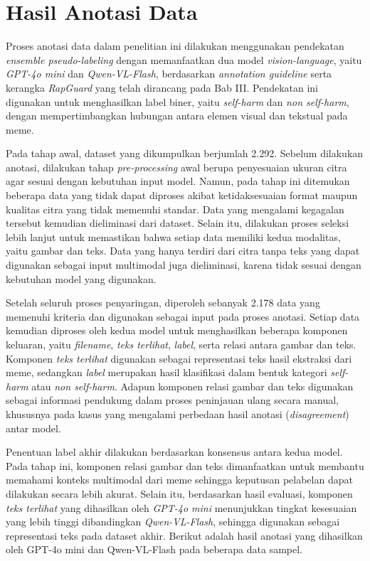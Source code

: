 \section{Hasil Anotasi Data} \label{IV.Anotasi}

Proses anotasi data dalam penelitian ini dilakukan menggunakan pendekatan \textit{ensemble pseudo-labeling} dengan memanfaatkan dua model \textit{vision-language}, yaitu \textit{GPT-4o mini} dan \textit{Qwen-VL-Flash}, berdasarkan \textit{annotation guideline} serta kerangka \textit{RapGuard} yang telah dirancang pada Bab III. Pendekatan ini digunakan untuk menghasilkan label biner, yaitu \textit{self-harm} dan \textit{non self-harm}, dengan mempertimbangkan hubungan antara elemen visual dan tekstual pada meme.

Pada tahap awal, dataset yang dikumpulkan berjumlah 2.292. Sebelum dilakukan anotasi, dilakukan tahap \textit{pre-processing} awal berupa penyesuaian ukuran citra  agar sesuai dengan kebutuhan input model. Namun, pada tahap ini ditemukan beberapa data yang tidak dapat diproses akibat ketidaksesuaian format maupun kualitas citra yang tidak memenuhi standar. Data yang mengalami kegagalan tersebut kemudian dieliminasi dari dataset. Selain itu, dilakukan proses seleksi lebih lanjut untuk memastikan bahwa setiap data memiliki kedua modalitas, yaitu gambar dan teks. Data yang hanya terdiri dari citra tanpa teks yang dapat digunakan sebagai input multimodal juga dieliminasi, karena tidak sesuai dengan kebutuhan model yang digunakan.

Setelah seluruh proses penyaringan, diperoleh sebanyak 2.178 data yang memenuhi kriteria dan digunakan sebagai input pada proses anotasi. Setiap data kemudian diproses oleh kedua model untuk menghasilkan beberapa komponen keluaran, yaitu \textit{filename}, \textit{teks terlihat}, \textit{label}, serta relasi antara gambar dan teks. Komponen \textit{teks terlihat} digunakan sebagai representasi teks hasil ekstraksi dari meme, sedangkan \textit{label} merupakan hasil klasifikasi dalam bentuk kategori \textit{self-harm} atau \textit{non self-harm}. Adapun komponen relasi gambar dan teks digunakan sebagai informasi pendukung dalam proses peninjauan ulang secara manual, khususnya pada kasus yang mengalami perbedaan hasil anotasi (\textit{disagreement}) antar model.

Penentuan label akhir dilakukan berdasarkan konsensus antara kedua model. Pada tahap ini, komponen relasi gambar dan teks dimanfaatkan untuk membantu memahami konteks multimodal dari meme sehingga keputusan pelabelan dapat dilakukan secara lebih akurat. Selain itu, berdasarkan hasil evaluasi, komponen \textit{teks terlihat} yang dihasilkan oleh \textit{GPT-4o mini} menunjukkan tingkat kesesuaian yang lebih tinggi dibandingkan \textit{Qwen-VL-Flash}, sehingga digunakan sebagai representasi teks pada dataset akhir. Berikut adalah hasil anotasi yang dihasilkan oleh GPT-4o mini dan Qwen-VL-Flash pada beberapa data sampel.

